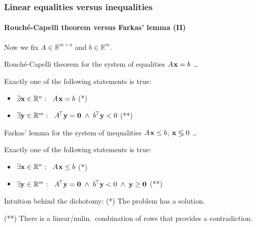 \documentclass{beamer}
\renewcommand{\.}{\hskip .75pt}
\DeclareMathOperator{\aand}{~\wedge~}
\begin{document}
\begin{frame}
	\frametitle{Linear equalities versus inequalities}
	\framesubtitle{Rouché-Capelli theorem versus Farkas' lemma (II)}
	
	Now we fix $A \in \mathbb{R}^{m \times n}$ and $b \in \mathbb{R}^{m}$.
	\bigskip
	
	{ \color{dred}
		Rouché-Capelli theorem for the system of equalities $A\. \bold{x} = b$ \dots
		
		Exactly one of the following statements is true:
	}
	\begin{itemize} \color{dred}
		\item $\exists \bold{x} \in \mathbb{R}^{n} : \ \; A\. \bold{x} = b$ \hfill\hbox{\footnotesize(*)\:\qquad}
		\item $\exists \bold{y} \in \mathbb{R}^{m} : \ \; A^{\!\top} \bold{y} = \bold{0} \aand b^{\!\top} \bold{y} < 0$ \hfill\hbox{\footnotesize(**)\qquad}
	\end{itemize}
	\medskip
	
	{ \color{dblue}
		Farkas' lemma for the system of inequalities $A\. \bold{x} \le b$, $\bold{x} \lessgtr 0$ \dots
		
		Exactly one of the following statements is true:
	}
	\begin{itemize} \color{dblue}
		\item $\exists \bold{x} \in \mathbb{R}^{n} : \ \; A\. \bold{x} \le b$ \hfill\hbox{\footnotesize(*)\:\qquad}
		\item $\exists \bold{y} \in \mathbb{R}^{m} : \ \; A^{\!\top} \bold{y} = \bold{0} \aand b^{\!\top} \bold{y} < 0 \aand \bold{y} \ge \bold{0}$ \hfill\hbox{\footnotesize(**)\qquad}
	\end{itemize}
	\medskip
	
	\footnotesize Intuition behind the dichotomy:\qquad
	(*) The problem has a solution.
	
	(**) There is a linear/nnlin.~combination of rows that provides a contradiction.

\end{frame}
\end{document}
